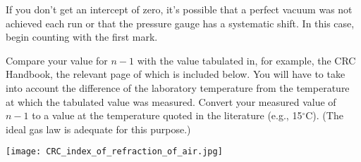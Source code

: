 \documentclass[11pt]{hmcpset}
\begin{document}
\begin{problem}
	If you don't get an intercept of zero, it's possible that a perfect vacuum was not achieved each run or that the pressure gauge has a systematic shift. In this case, begin counting with the first mark.
	
	Compare your value for $n-1$ with the value tabulated in, for example, the CRC Handbook, the relevant page of which is included below. You will have to take into account the difference of the laboratory temperature from the temperature at which the tabulated value was measured. Convert your measured value of $n-1$ to a value at the temperature quoted in the literature (e.g., 15$^\circ$C). (The ideal gas law is adequate for this purpose.)
\end{problem}

\begin{solution}
	
	\vfill
	
\end{solution}

\pagebreak
\texttt{[image: CRC\_index\_of\_refraction\_of\_air.jpg]}
\end{document}
